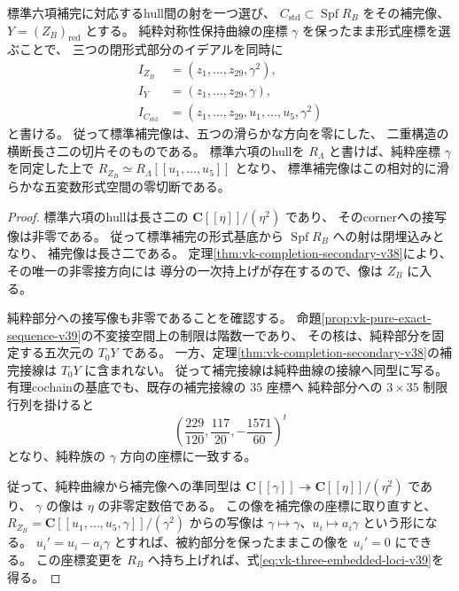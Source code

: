 \begin{corollary}[標準六項補完像は横断長さ二の切片である]
\label{cor:vk-completion-transverse-slice-v39}
標準六項補完に対応するhull間の射を一つ選び、
$C_{\mathrm{std}}\subset\operatorname{Spf}R_B$ をその補完像、
$Y=(Z_B)_{\mathrm{red}}$ とする。
純粋対称性保持曲線の座標 $\gamma$ を保ったまま形式座標を選ぶことで、
三つの閉形式部分のイデアルを同時に
\begin{equation}
 \begin{aligned}
 I_{Z_B}&=(z_1,\ldots,z_{29},\gamma^2),\\
 I_Y&=(z_1,\ldots,z_{29},\gamma),\\
 I_{C_{\mathrm{std}}}&=(z_1,\ldots,z_{29},u_1,\ldots,u_5,\gamma^2)
 \end{aligned}
 \label{eq:vk-three-embedded-loci-v39}
\end{equation}
と書ける。
従って標準補完像は、五つの滑らかな方向を零にした、
二重構造の横断長さ二の切片そのものである。
標準六項のhullを $R_{\Lambda}$ と書けば、純粋座標 $\gamma$ を同定した上で
$R_{Z_B}\simeq R_{\Lambda}[[u_1,\ldots,u_5]]$ となり、
標準補完像はこの相対的に滑らかな五変数形式空間の零切断である。
\end{corollary}

\begin{proof}
標準六項のhullは長さ二の $\mathbf C[[\eta]]/(\eta^2)$ であり、
そのcornerへの接写像は非零である。
従って標準補完の形式基底から $\operatorname{Spf}R_B$ への射は閉埋込みとなり、
補完像は長さ二である。
定理\ref{thm:vk-completion-secondary-v38}により、その唯一の非零接方向には
導分の一次持上げが存在するので、像は $Z_B$ に入る。

純粋部分への接写像も非零であることを確認する。
命題\ref{prop:vk-pure-exact-sequence-v39}の不変接空間上の制限は階数一であり、
その核は、純粋部分を固定する五次元の $T_0Y$ である。
一方、定理\ref{thm:vk-completion-secondary-v38}の補完接線は $T_0Y$ に含まれない。
従って補完接線は純粋曲線の接線へ同型に写る。
有理cochainの基底でも、既存の補完接線の $35$ 座標へ
純粋部分への $3\times35$ 制限行列を掛けると
\[
 \left(\frac{229}{120},\frac{117}{20},-\frac{1571}{60}\right)^t
\]
となり、純粋族の $\gamma$ 方向の座標に一致する。

従って、純粋曲線から補完像への準同型は
$\mathbf C[[\gamma]]\twoheadrightarrow\mathbf C[[\eta]]/(\eta^2)$ であり、
$\gamma$ の像は $\eta$ の非零定数倍である。
この像を補完像の座標に取り直すと、
$R_{Z_B}=\mathbf C[[u_1,\ldots,u_5,\gamma]]/(\gamma^2)$ からの写像は
$\gamma\mapsto\gamma$、$u_i\mapsto a_i\gamma$ という形になる。
$u_i'=u_i-a_i\gamma$ とすれば、被約部分を保ったままこの像を $u_i'=0$ にできる。
この座標変更を $R_B$ へ持ち上げれば、式\eqref{eq:vk-three-embedded-loci-v39}を得る。
\end{proof}
